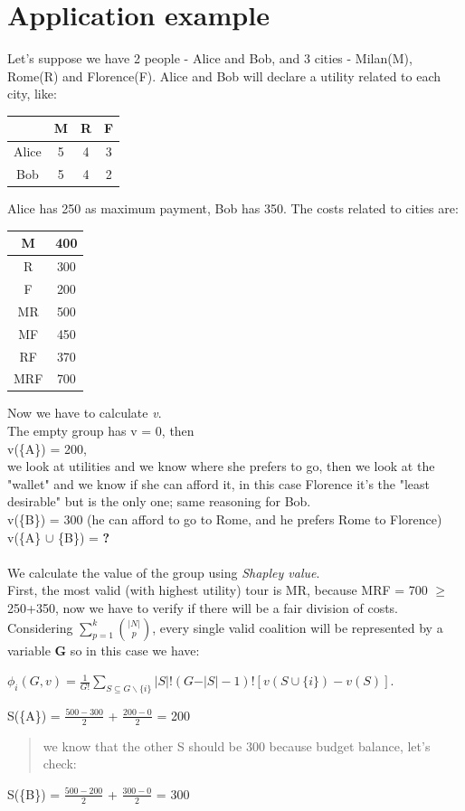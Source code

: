 \documentclass{article}
\begin{document}
\section{Application example}
\Large{
Let's suppose we have 2 people - Alice and Bob, and 3 cities - Milan(M), Rome(R) and Florence(F). Alice and Bob will declare a utility related to each city, like:
\begin{center}
\begin{tabular}{ |c|c|c|c| } 
 \hline
  & M & R & F \\ 
 \hline
 Alice & 5 & 4 & 3\\ 
 \hline
 Bob & 5 & 4 & 2\\ 
 \hline
\end{tabular}\newpage
\end{center}
Alice has 250 as maximum payment, Bob has 350. The costs related to cities are:
\begin{center}
\begin{tabular}{ |c|c| } 
 \hline
 M & 400 \\ 
 \hline
 R & 300\\ 
 \hline
 F & 200\\ 
 \hline
 MR & 500\\ 
 \hline
 MF & 450\\ 
 \hline
 RF & 370\\ 
 \hline
 MRF & 700\\ 
 \hline
\end{tabular}
\end{center}
Now we have to calculate \textit{v}. \\The empty group has v = 0, then \\v(\{A\}) = 200, \\we look at utilities and we know where she prefers to go, then we look at the "wallet" and we know if she can afford it, in this case Florence it's the "least desirable" but is the only one; same reasoning for Bob.\\
v(\{B\}) = 300 (he can afford to go to Rome, and he prefers Rome to Florence)\\
v(\{A\} $\cup$ \{B\}) = \textbf{?} \\\\
We calculate the value of the group using \textit{Shapley value}.\\
First, the most valid (with highest utility) tour is MR, because MRF = 700 $\ge$ 250+350, now we have to verify if there will be a fair division of costs.\\
Considering $\displaystyle\sum_{p=1}^k \binom {\vert N \vert} {p}$, every single valid coalition will be represented by a variable \textbf{G} so in this case we have:
\begin{center}
   \normalsize{
        $\phi_i(G,v) = \frac{1}{G!} \displaystyle \sum_{S \subseteq G \backslash \{i\}} \vert S \vert!(G -  \vert S \vert - 1)! [v(S \cup \{i\}) - v(S)]$.
    }
\end{center}
S(\{A\}) = $\frac {500 - 300} {2}$ + $\frac {200 - 0} {2}$  = 200
\begin{quote}
    we know that the other S should be 300 because budget balance, let's check:
\end{quote}
S(\{B\}) = $\frac {500 - 200} {2}$ + $\frac {300 - 0} {2}$ = 300
}
\end{document}
